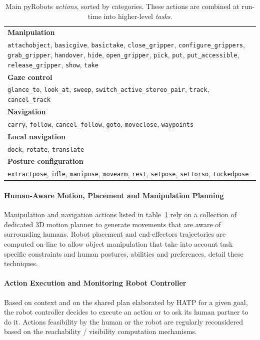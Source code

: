 \documentclass[preprint,3p,times]{elsarticle}
\begin{document}
\begin{table}[ht!]
\begin{center}
\begin{tabular}{p{}}
\hline
    {\bf Manipulation} \\
     {\tt attachobject}, {\tt basicgive}, {\tt basictake}, {\tt close\_gripper}, {\tt configure\_grippers}, {\tt grab\_gripper}, {\tt handover}, {\tt hide}, {\tt open\_gripper}, {\tt pick}, {\tt put}, {\tt put\_accessible}, {\tt release\_gripper}, {\tt show}, {\tt take} \\
\hline
    {\bf Gaze control} \\
     {\tt glance\_to}, {\tt look\_at}, {\tt sweep}, {\tt switch\_active\_stereo\_pair}, {\tt track}, {\tt cancel\_track} \\
\hline
    {\bf Navigation} \\
     {\tt carry}, {\tt follow}, {\tt cancel\_follow}, {\tt goto}, {\tt moveclose}, {\tt waypoints} \\
\hline
    {\bf Local navigation} \\
     {\tt dock}, {\tt rotate}, {\tt translate} \\
\hline
    {\bf Posture configuration} \\
     {\tt extractpose}, {\tt idle}, {\tt manipose}, {\tt movearm}, {\tt rest}, {\tt setpose}, {\tt settorso}, {\tt tuckedpose} \\
\hline
\end{tabular}
\end{center}
\caption{Main {\sc pyRobots} \emph{actions}, sorted by categories. These
actions are combined at run-time into higher-level \emph{tasks}.}

\label{table|pyrobots_actions}
\end{table}

\paragraph{Human-Aware Motion, Placement and Manipulation Planning}
Manipulation and navigation actions listed in
table~\ref{table|pyrobots_actions} rely on a collection of dedicated 3D motion
planner to generate movements that are aware of surrounding humans. Robot
placement and end-effectors trajectories are computed on-line to allow object
manipulation that take into account task specific constraints and human
postures, abilities and preferences. \cite{Sisbot2008, Mainprice2011,
Pandey2011} detail these techniques.


\paragraph{Action Execution and Monitoring Robot Controller}
Based on context and on the shared plan elaborated by HATP for a given goal,
the robot controller decides to execute an action or to ask its human
partner to do it.  Actions feasibility by the human or the robot are
regularly reconsidered based on the reachability / visibility
computation mechanisms.
\end{document}
